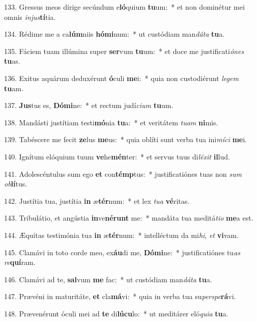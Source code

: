 133. Gressus meos dírige secúndum e\textbf{ló}quium \textbf{tu}um:~*  et non dominétur mei omnis \textit{in}\textit{jus}\textbf{tí}tia.\

134. Rédime me a ca\textbf{lúm}niis \textbf{hó}\textbf{mi}num:~*  ut custódiam man\textit{dá}\textit{ta} \textbf{tu}a.\

135. Fáciem tuam illúmina super \textbf{ser}vum \textbf{tu}um:~*  et doce me justificati\textit{ó}\textit{nes} \textbf{tu}as.\

136. Exitus aquárum deduxérunt \textbf{ó}culi \textbf{me}i:~*  quia non custodiérunt \textit{le}\textit{gem} \textbf{tu}am.\

137. \textbf{Jus}tus es, \textbf{Dó}\textbf{mi}ne:~*  et rectum judí\textit{ci}\textit{um} \textbf{tu}um.\

138. Mandásti justítiam testi\textbf{mó}nia \textbf{tu}a:~*  et veritátem \textit{tu}\textit{am} \textbf{ni}mis.\

139. Tabéscere me fecit \textbf{ze}lus \textbf{me}us:~*  quia oblíti sunt verba tua ini\textit{mí}\textit{ci} \textbf{me}i.\

140. Ignítum elóquium tuum \textbf{ve}he\textbf{mén}ter:~*  et servus tuus di\textit{lé}\textit{xit} \textbf{il}lud.\

141. Adolescéntulus sum ego \textbf{et} con\textbf{témp}tus:~*  justificatiónes tuas non \textit{sum} \textit{ob}\textbf{lí}tus.\

142. Justítia tua, justítia \textbf{in} æ\textbf{tér}num:~*  et lex \textit{tu}\textit{a} \textbf{vé}ritas.\

143. Tribulátio, et angústia \textbf{in}ve\textbf{né}\textbf{runt} me:~*  mandáta tua meditá\textit{ti}\textit{o} \textbf{me}a est.\

144. Æquitas testimónia tua \textbf{in} æ\textbf{tér}num:~*  intelléctum da mi\textit{hi}, \textit{et} \textbf{vi}vam.\

145. Clamávi in toto corde meo, ex\textbf{áu}di me, \textbf{Dó}\textbf{mi}ne:~*  justificatiónes tu\textit{as} \textit{re}\textbf{quí}ram.\

146. Clamávi ad te, \textbf{sal}vum \textbf{me} fac:~*  ut custódiam man\textit{dá}\textit{ta} \textbf{tu}a.\

147. Prævéni in maturitáte, \textbf{et} cla\textbf{má}vi:~*  quia in verba tua su\textit{per}\textit{spe}\textbf{rá}vi.\

148. Prævenérunt óculi mei ad \textbf{te} di\textbf{lú}\textbf{cu}lo:~*  ut meditárer eló\textit{qui}\textit{a} \textbf{tu}a.\

